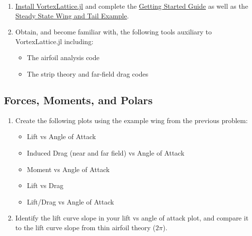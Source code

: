 \documentclass[11pt]{article}
\begin{document}
\begin{enumerate}[label=\roman*.]
	\item \href{https://flow.byu.edu/VortexLattice.jl/stable/#Installation}{Install VortexLattice.jl} and complete the \href{https://flow.byu.edu/VortexLattice.jl/stable/guide/}{Getting Started Guide} as well as the \href{https://flow.byu.edu/VortexLattice.jl/stable/examples/#Steady-State-Analysis-of-a-Wing-and-Tail}{Steady State Wing and Tail Example}.
	\item Obtain, and become familiar with, the following tools auxiliary to VortexLattice.jl including:
	\begin{itemize}
		\item The airfoil analysis code
		\item The strip theory and far-field drag codes
	\end{itemize}
\end{enumerate}


\subsection{Forces, Moments, and Polars}

\begin{enumerate}[label=\roman*.]
	\item Create the following plots using the example wing from the previous problem:
	\begin{itemize}
		\item Lift vs Angle of Attack
		\item Induced Drag (near and far field) vs Angle of Attack
		\item Moment vs Angle of Attack
		\item Lift vs Drag
		\item Lift/Drag vs Angle of Attack
	\end{itemize}
	\item Identify the lift curve slope in your lift vs angle of attack plot, and compare it to the lift curve slope from thin airfoil theory (\(2\pi\)).
\end{enumerate}
\end{document}
